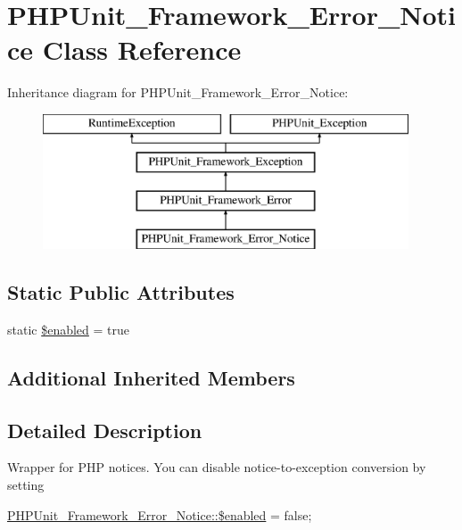 \hypertarget{class_p_h_p_unit___framework___error___notice}{}\section{P\+H\+P\+Unit\+\_\+\+Framework\+\_\+\+Error\+\_\+\+Notice Class Reference}
\label{class_p_h_p_unit___framework___error___notice}
Inheritance diagram for P\+H\+P\+Unit\+\_\+\+Framework\+\_\+\+Error\+\_\+\+Notice\+:\begin{figure}[H]
\begin{center}
\leavevmode
\includegraphics[height=4.000000cm]{class_p_h_p_unit___framework___error___notice}
\end{center}
\end{figure}
\subsection*{Static Public Attributes}
\begin{DoxyCompactItemize}
\item 
static \mbox{\hyperlink{class_p_h_p_unit___framework___error___notice_a8d376199cc641e3e7af6e1a0d5c736d9}{\$enabled}} = true
\end{DoxyCompactItemize}
\subsection*{Additional Inherited Members}


\subsection{Detailed Description}
Wrapper for P\+HP notices. You can disable notice-\/to-\/exception conversion by setting

{\ttfamily  \mbox{\hyperlink{class_p_h_p_unit___framework___error___notice_a8d376199cc641e3e7af6e1a0d5c736d9}{P\+H\+P\+Unit\+\_\+\+Framework\+\_\+\+Error\+\_\+\+Notice\+::\$enabled}} = false; } 

